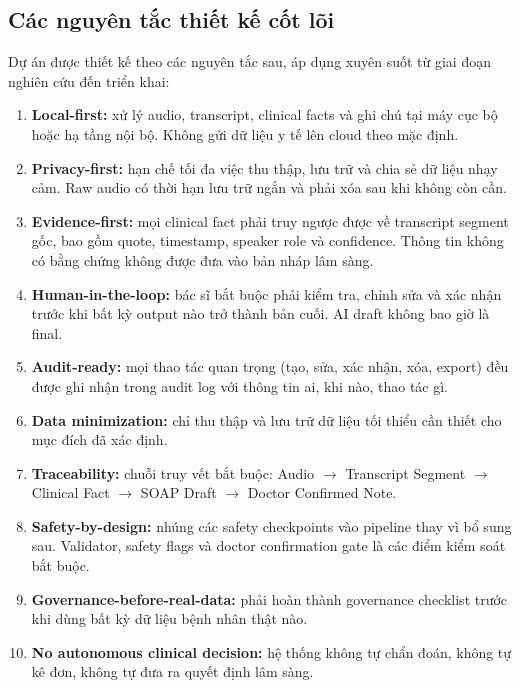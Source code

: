 \documentclass[12pt,a4paper]{article}
\begin{document}
\subsection{Các nguyên tắc thiết kế cốt lõi}

Dự án được thiết kế theo các nguyên tắc sau, áp dụng xuyên suốt từ giai đoạn nghiên cứu đến triển khai:

\begin{enumerate}
    \item \textbf{Local-first:} xử lý audio, transcript, clinical facts và ghi chú tại máy cục bộ hoặc hạ tầng nội bộ. Không gửi dữ liệu y tế lên cloud theo mặc định.
    \item \textbf{Privacy-first:} hạn chế tối đa việc thu thập, lưu trữ và chia sẻ dữ liệu nhạy cảm. Raw audio có thời hạn lưu trữ ngắn và phải xóa sau khi không còn cần.
    \item \textbf{Evidence-first:} mọi clinical fact phải truy ngược được về transcript segment gốc, bao gồm quote, timestamp, speaker role và confidence. Thông tin không có bằng chứng không được đưa vào bản nháp lâm sàng.
    \item \textbf{Human-in-the-loop:} bác sĩ bắt buộc phải kiểm tra, chỉnh sửa và xác nhận trước khi bất kỳ output nào trở thành bản cuối. AI draft không bao giờ là final.
    \item \textbf{Audit-ready:} mọi thao tác quan trọng (tạo, sửa, xác nhận, xóa, export) đều được ghi nhận trong audit log với thông tin ai, khi nào, thao tác gì.
    \item \textbf{Data minimization:} chỉ thu thập và lưu trữ dữ liệu tối thiểu cần thiết cho mục đích đã xác định.
    \item \textbf{Traceability:} chuỗi truy vết bắt buộc: Audio $\rightarrow$ Transcript Segment $\rightarrow$ Clinical Fact $\rightarrow$ SOAP Draft $\rightarrow$ Doctor Confirmed Note.
    \item \textbf{Safety-by-design:} nhúng các safety checkpoints vào pipeline thay vì bổ sung sau. Validator, safety flags và doctor confirmation gate là các điểm kiểm soát bắt buộc.
    \item \textbf{Governance-before-real-data:} phải hoàn thành governance checklist trước khi dùng bất kỳ dữ liệu bệnh nhân thật nào.
    \item \textbf{No autonomous clinical decision:} hệ thống không tự chẩn đoán, không tự kê đơn, không tự đưa ra quyết định lâm sàng.
\end{enumerate}
\end{document}
